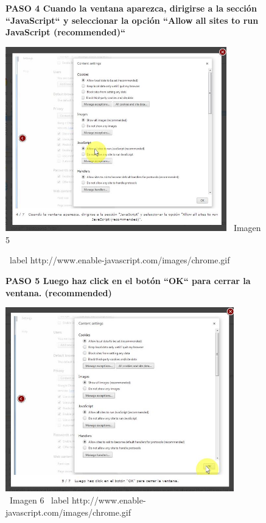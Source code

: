 \documentclass[11pt]{article} %
\begin{document}
\begin{figure}
\begin{center}
\begin{center}

\bf PASO 4
Cuando la ventana aparezca, dirigirse a la sección ``JavaScript``  y seleccionar la opción ``Allow all sites to run JavaScript (recommended)``
\newline
\end{center}

\includegraphics[height=8cm, width=8 cm] {imagenes/chrome 04.JPG}
\newline
\ Imagen 5

\ label { http://www.enable-javascript.com/images/chrome.gif }

\begin{center}
\bf PASO 5
Luego haz click en el botón ``OK`` para cerrar la ventana. (recommended)
\newline
\end{center}

\includegraphics[height=8cm, width=8 cm] {imagenes/chrome 05.JPG}
\newline
\newline
\ Imagen 6
\ label { http://www.enable-javascript.com/images/chrome.gif }
\newline
\end{center}
\end{figure}
\end{document}
